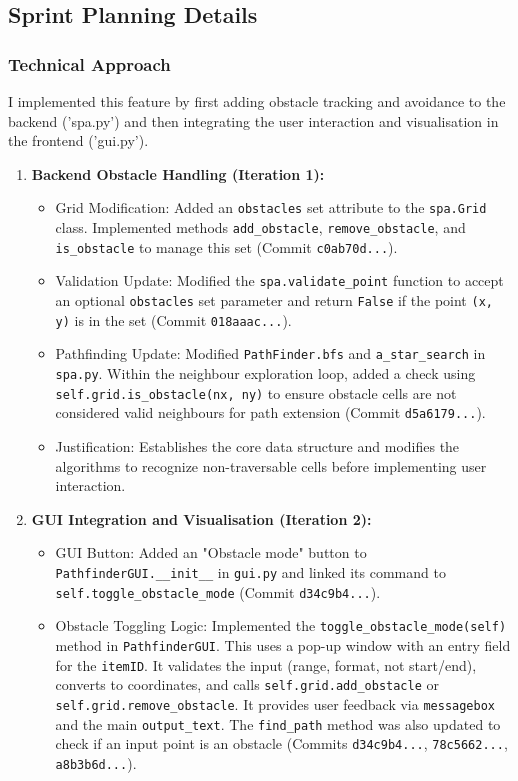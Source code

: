 \clearpage
\subsection{Sprint Planning Details}

\subsubsection{Technical Approach}
I implemented this feature by first adding obstacle tracking and avoidance to the backend ('spa.py') and then integrating the user interaction and visualisation in the frontend ('gui.py').

\begin{enumerate}
    \item \textbf{Backend Obstacle Handling (Iteration 1):}
    \begin{itemize}
        \item Grid Modification: Added an \verb|obstacles| set attribute to the \verb|spa.Grid| class. Implemented methods \verb|add_obstacle|, \verb|remove_obstacle|, and \verb|is_obstacle| to manage this set (Commit \verb|c0ab70d...|).
        \item Validation Update: Modified the \verb|spa.validate_point| function to accept an optional \verb|obstacles| set parameter and return \verb|False| if the point \verb|(x, y)| is in the set (Commit \verb|018aaac...|).
        \item Pathfinding Update: Modified \verb|PathFinder.bfs| and \verb|a_star_search| in \verb|spa.py|. Within the neighbour exploration loop, added a check using \verb|self.grid.is_obstacle(nx, ny)| to ensure obstacle cells are not considered valid neighbours for path extension (Commit \verb|d5a6179...|).
        \item Justification: Establishes the core data structure and modifies the algorithms to recognize non-traversable cells before implementing user interaction.
    \end{itemize}
    \item \textbf{GUI Integration and Visualisation (Iteration 2):}
    \begin{itemize}
        \item GUI Button: Added an "Obstacle mode" button to \verb|PathfinderGUI.__init__| in \verb|gui.py| and linked its command to \verb|self.toggle_obstacle_mode| (Commit \verb|d34c9b4...|).
        \item Obstacle Toggling Logic: Implemented the \verb|toggle_obstacle_mode(self)| method in \verb|PathfinderGUI|. This uses a pop-up window with an entry field for the \verb|itemID|. It validates the input (range, format, not start/end), converts to coordinates, and calls \verb|self.grid.add_obstacle| or \verb|self.grid.remove_obstacle|. It provides user feedback via \verb|messagebox| and the main \verb|output_text|. The \verb|find_path| method was also updated to check if an input point is an obstacle (Commits \verb|d34c9b4...|, \verb|78c5662...|, \verb|a8b3b6d...|).

\end{itemize}
\end{enumerate}
